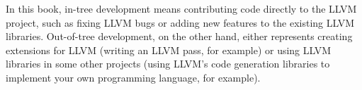\begin{tcolorbox}[colback=blue!5!white,colframe=blue!75!black, fonttitle=\bfseries,title=In-tree versus out-of-tree development]
\hspace*{0.7cm}In this book, in-tree development means contributing code directly to the LLVM project, such as fixing LLVM bugs or adding new features to the existing LLVM libraries. Out-of-tree development, on the other hand, either represents creating extensions for LLVM (writing an LLVM pass, for example) or using LLVM libraries in some other projects (using LLVM's code generation libraries to implement your own programming language, for example).
\end{tcolorbox}














